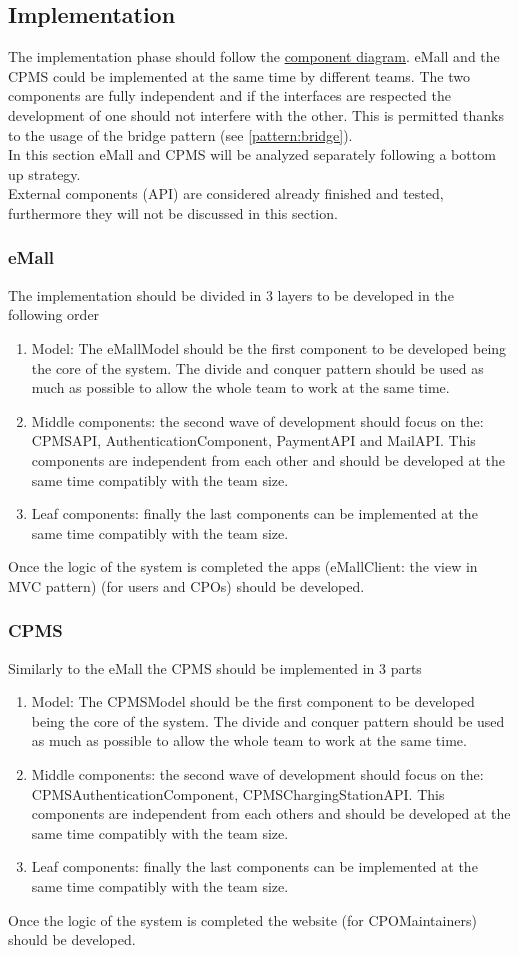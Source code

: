 \subsection{Implementation}
The implementation phase should follow the \hyperref[fig:eMSP-component]{component diagram}. \ac{eMall} and the \ac{CPMS} could be implemented at the same time by different teams. The two components are fully independent and if the interfaces are respected the development of one should not interfere with the other. This is permitted thanks to the usage of the bridge pattern (see \autoref{pattern:bridge}).\\
In this section \ac{eMall} and \ac{CPMS} will be analyzed separately following a bottom up strategy.\\
External components (\ac{API}) are considered already finished and tested, furthermore they will not be discussed in this section.
\subsubsection{eMall}
The implementation should be divided in 3 layers to be developed in the following order
\begin{enumerate}
    \item Model: The eMallModel should be the first component to be developed being the core of the system. The divide and conquer pattern should be used as much as possible to allow the whole team to work at the same time.
    \item Middle components: the second wave of development should focus on the: \ac{CPMS}\ac{API}, AuthenticationComponent, Payment\ac{API} and Mail\ac{API}. This components are independent from each other and should be developed at the same time compatibly with the team size.
    \item Leaf components: finally the last components can be implemented at the same time compatibly with the team size.
\end{enumerate}
Once the logic of the system is completed the apps (eMallClient: the view in \ac{MVC} pattern) (for users and \acp{CPO}) should be developed.
\subsubsection{CPMS}
Similarly to the \ac{eMall} the \ac{CPMS} should be implemented in 3 parts
\begin{enumerate}
    \item Model: The CPMSModel should be the first component to be developed being the core of the system. The divide and conquer pattern should be used as much as possible to allow the whole team to work at the same time.
    \item Middle components: the second wave of development should focus on the: CPMSAuthenticationComponent, CPMSChargingStation\ac{API}. This components are independent from each others and should be developed at the same time compatibly with the team size.
    \item Leaf components: finally the last components can be implemented at the same time compatibly with the team size.
\end{enumerate}
Once the logic of the system is completed the website (for \ac{CPO}Maintainers) should be developed.
